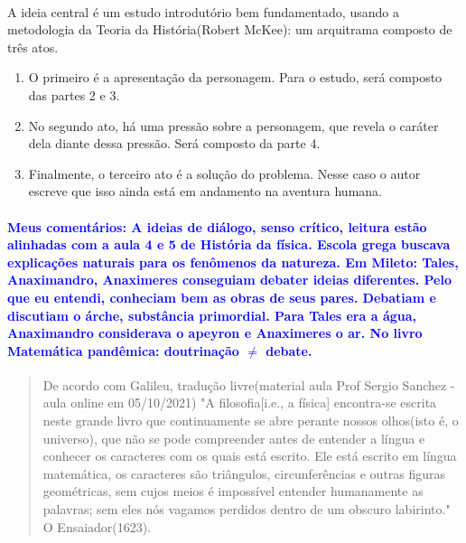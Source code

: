 \documentclass[a4paper]{article}
\begin{document}
	\paragraph{}A ideia central é um estudo introdutório bem fundamentado, usando a metodologia da Teoria da História(Robert McKee): um arquitrama composto de três atos. 
	\begin{enumerate}
		\item O primeiro é a apresentação da personagem. Para o estudo, será composto das partes 2 e 3.
		\item No segundo ato, há uma pressão sobre a personagem, que revela o caráter dela diante dessa pressão. Será composto da parte 4.
		\item Finalmente, o terceiro ato é a solução do problema. Nesse caso o autor escreve que isso ainda está em andamento na aventura humana.
	\end{enumerate}
	\paragraph{\textcolor{blue}{Meus comentários: A ideias de diálogo, senso crítico, leitura estão alinhadas com a aula 4 e 5 de História da física. Escola grega buscava explicações naturais para os fenômenos da natureza. Em Mileto: Tales, Anaximandro, Anaximeres conseguiam debater ideias diferentes. Pelo que eu entendi, conheciam bem as obras de seus pares. Debatiam e discutiam o árche, substância primordial. Para Tales era a água, Anaximandro considerava o apeyron e Anaximeres o ar. No livro Matemática pandêmica: doutrinação $\neq$ debate.}}
	
	\newpage
	\begin{quote}
	De acordo com Galileu, tradução livre(material aula Prof Sergio Sanchez - aula online em 05/10/2021)\newline
	"A filosofia[i.e., a física] encontra-se escrita neste grande livro que continuamente se abre perante nossos olhos(isto é, o universo), que não se pode compreender antes de entender a língua e conhecer os caracteres com os quais está escrito. Ele está escrito em língua matemática, os caracteres são triângulos, circunferências e outras figuras geométricas, sem cujos meios é impossível entender humanamente as palavras; sem eles nós vagamos perdidos dentro de um obscuro labirinto."
	\newline
	O Ensaiador(1623).
		\end{quote}
\end{document}
